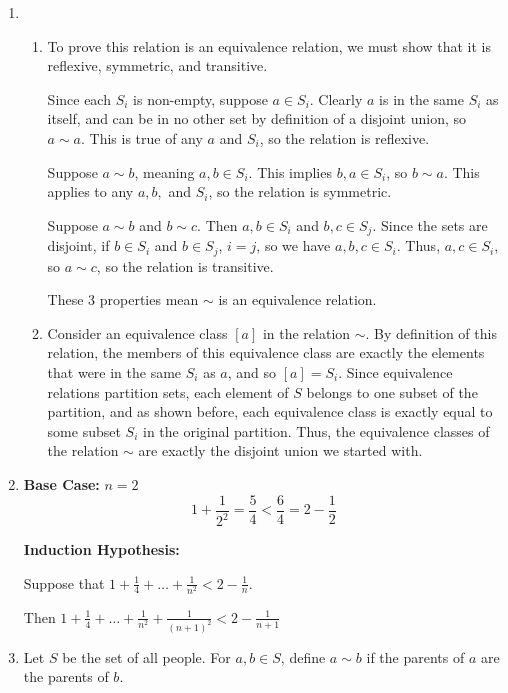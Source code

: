 \documentclass{article}
\begin{document}
\begin{enumerate}
    \item 
        \begin{enumerate}
            \item To prove this relation is an equivalence relation, we must show that it is reflexive, symmetric, and transitive.

            Since each $S_i$ is non-empty, suppose $a \in S_i$. Clearly $a$ is in the same $S_i$ as itself, and can be in no other set by definition of a disjoint union, so $a \sim a$. This is true of any $a$ and $S_i$, so the relation is reflexive. 

            Suppose $a \sim b$, meaning $a, b \in S_i$. This implies $b, a \in S_i$, so $b \sim a$. This applies to any $a, b,$ and $S_i$, so the relation is symmetric. 

            Suppose $a \sim b$ and $b \sim c$. Then $a, b \in S_i$ and $b, c \in S_j$. Since the sets are disjoint, if $b \in S_i$ and $b \in S_j$, $i = j$, so we have $a, b, c \in S_i$. Thus, $a, c \in S_i$, so $a \sim c$, so the relation is transitive. 

            These 3 properties mean $\sim$ is an equivalence relation.

            \item Consider an equivalence class $[a]$ in the relation $\sim$. By definition of this relation, the members of this equivalence class are exactly the elements that were in the same $S_i$ as $a$, and so $[a] = S_i$. Since equivalence relations partition sets, each element of $S$ belongs to one subset of the partition, and as shown before, each equivalence class is exactly equal to some subset $S_i$ in the original partition. Thus, the equivalence classes of the relation $\sim$ are exactly the disjoint union we started with. 
        \end{enumerate}

    \item 
        \textbf{Base Case: } $n = 2$
        $$1 + \frac{1}{2^2} = \frac{5}{4} < \frac{6}{4} = 2 - \frac{1}{2}$$

        \textbf{Induction Hypothesis:}

        
        Suppose that $1 + \frac{1}{4} + \dots + \frac{1}{n^2} < 2 - \frac{1}{n}$.

        Then $1 + \frac{1}{4} + \dots + \frac{1}{n^2} + \frac{1}{(n+1)^2} < 2 - \frac{1}{n+1}$

    \item Let $S$ be the set of all people. For $a, b \in S$, define $a \sim b$ if the parents of $a$ are the parents of $b$. 


\end{enumerate}
\end{document}
